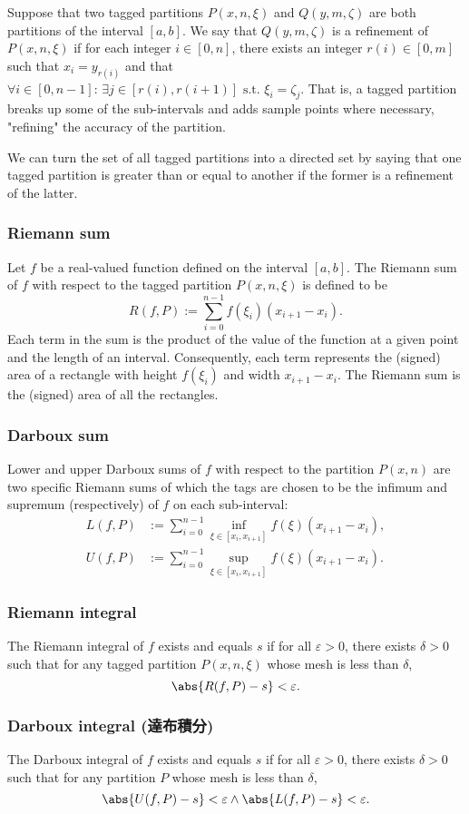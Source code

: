\documentclass[a4paper,12pt]{report}
\begin{document}
Suppose that two tagged partitions $P(x,n,\xi)$ and $Q(y,m,\zeta)$ are both partitions of the interval $[a,b]$. We say that $Q(y,m,\zeta)$ is a refinement of $P(x,n,\xi)$ if for each integer $i\in [0,n]$, there exists an integer $r(i)\in [0,m]$ such that $x_i = y_{r(i)}$ and that $\forall i\in [0,n-1]:\,\exists j\in [r(i),r(i + 1)] \text{\ s.t.\ }\xi_i = \zeta_j$. That is, a tagged partition breaks up some of the sub-intervals and adds sample points where necessary, "refining" the accuracy of the partition.

We can turn the set of all tagged partitions into a directed set by saying that one tagged partition is greater than or equal to another if the former is a refinement of the latter.
\subsubsection{Riemann sum}
Let $f$ be a real-valued function defined on the interval $[a,b]$. The Riemann sum of $f$ with respect to the tagged partition $P(x,n,\xi)$ is defined to be
\[R(f,P):=\sum_{i=0}^{n-1}f(\xi_i)\left(x_{i+1}-x_i\right).\]
Each term in the sum is the product of the value of the function at a given point and the length of an interval. Consequently, each term represents the (signed) area of a rectangle with height $f(\xi_i)$ and width $x_{i + 1} − x_i$. The Riemann sum is the (signed) area of all the rectangles.
\subsubsection{Darboux sum}
Lower and upper Darboux sums of $f$ with respect to the partition $P(x,n)$ are two specific Riemann sums of which the tags are chosen to be the infimum and supremum (respectively) of $f$ on each sub-interval:
\[\begin{aligned}
L(f,P)&:=\sum_{i=0}^{n-1}\inf_{\xi\in [x_i,x_{i+1}]}f(\xi)(x_{i+1}-x_i),\\
U(f,P)&:=\sum_{i=0}^{n-1}\sup_{\xi\in [x_i,x_{i+1}]}f(\xi)(x_{i+1}-x_i).
\end{aligned}\]
\subsubsection{Riemann integral}
The Riemann integral of $f$ exists and equals $s$ if for all $\varepsilon > 0$, there exists $\delta > 0$ such that for any tagged partition $P(x,n,\xi)$ whose mesh is less than $\delta$,
\[\abs{R(f,P)-s}<\varepsilon .\]
\subsubsection{Darboux integral (達布積分)}
The Darboux integral of $f$ exists and equals $s$ if for all $\varepsilon > 0$, there exists $\delta > 0$ such that for any partition $P$ whose mesh is less than $\delta$,
\[\abs{U(f,P)-s}<\varepsilon \land \abs{L(f,P)-s}<\varepsilon.\]
\end{document}
